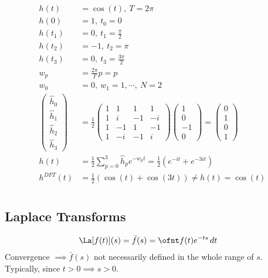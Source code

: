 \documentclass[cplx.tex]{subfiles}
\begin{document}
\begin{example}
\begin{align}
    h(t) &= \cos(t),~ T = 2\pi \\
    h(0) &= 1,~ t_0 = 0 \\
    h(t_1) &= 0,~ t_1 = \frac{\pi}{2} \\
    h(t_2) &= -1,~ t_2 = \pi \\
    h(t_3) &= 0,~ t_3 = \frac{3\pi}{2} \\
    w_p &= \frac{2\pi}{T}p = p \\
    w_0 &= 0,~  w_1 = 1, \cdots,~ N = 2 \\
    \begin{pmatrix} \hat{h}_0 \\ \hat{h}_1 \\ \hat{h}_2 \\ \hat{h}_3 \end{pmatrix} &= \frac{1}{2}\begin{pmatrix} 1 & 1 & 1 & 1 \\ 1 & i & -1 & -i \\ 1 & -1 & 1 & -1 \\ 1 & -i & -1 & i \end{pmatrix}\begin{pmatrix} 1 \\ 0 \\ -1 \\ 0\end{pmatrix} = \begin{pmatrix} 0 \\ 1 \\ 0 \\ 1 \end{pmatrix} \\
    h(t) &= \frac12 \sum_{p=0}^3 \hat{h}_p e^{-w_p t} = \frac12\left(e^{-it} + e^{-3it}\right) \\
    h^{DFT}(t) &= \frac12 \left(\cos(t) + \cos(3t)\right) \neq h(t) = \cos(t)
\end{align}
\end{example}

\chapter{}
\section{Laplace Transforms}
\begin{align}
    \La[f(t)](s) = \bar{f}(s) &= \ofnt f(t)e^{-ts}\,dt
\end{align}
Convergence $\implies \bar{f}(s)$ not necessarily defined in the whole range of $s$.
Typically, since $t>0 \implies s>0$.
\end{document}
